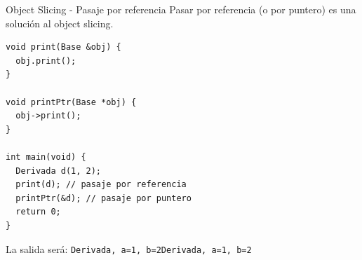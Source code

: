 \begin{frame}{Object Slicing - Pasaje por referencia}{
  Pasar por referencia (o por puntero) es una soluci\'on al object slicing.
}
  \begin{lstlisting}[style=normal,firstnumber=26,linebackgroundcolor={%
                 \btLstHLB<1>{36, 37}%
         }]
void print(Base &obj) {
  obj.print();
}

void printPtr(Base *obj) {
  obj->print();
}

int main(void) { 
  Derivada d(1, 2);
  print(d); // pasaje por referencia
  printPtr(&d); // pasaje por puntero
  return 0;
}

  \end{lstlisting}

La salida ser\'a: \texttt{\newline Derivada, a=1, b=2\newline Derivada, a=1, b=2}
\end{frame}

